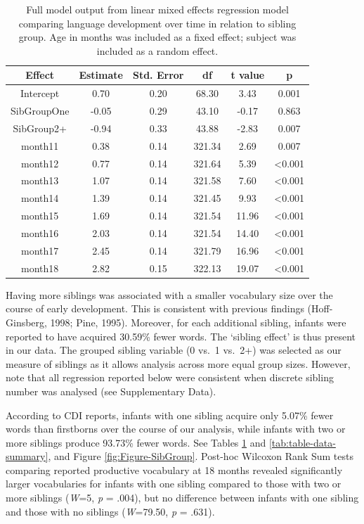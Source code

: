 \documentclass[
  man,floatsintext]{apa6}
\begin{document}
\begin{longtable}[t]{cccccc}
\caption{\label{tab:table-sibgroup-model-summary}Full model output from linear mixed effects regression model comparing language development over time in relation to sibling group. Age in months was included as a fixed effect; subject was included as a random effect.}\\
\toprule
Effect & Estimate & Std. Error & df & t value & p\\
\midrule
Intercept & 0.70 & 0.20 & 68.30 & 3.43 & 0.001\\
SibGroupOne & -0.05 & 0.29 & 43.10 & -0.17 & 0.863\\
SibGroup2+ & -0.94 & 0.33 & 43.88 & -2.83 & 0.007\\
month11 & 0.38 & 0.14 & 321.34 & 2.69 & 0.007\\
month12 & 0.77 & 0.14 & 321.64 & 5.39 & <0.001\\
\addlinespace
month13 & 1.07 & 0.14 & 321.58 & 7.60 & <0.001\\
month14 & 1.39 & 0.14 & 321.45 & 9.93 & <0.001\\
month15 & 1.69 & 0.14 & 321.54 & 11.96 & <0.001\\
month16 & 2.03 & 0.14 & 321.54 & 14.40 & <0.001\\
month17 & 2.45 & 0.14 & 321.79 & 16.96 & <0.001\\
\addlinespace
month18 & 2.82 & 0.15 & 322.13 & 19.07 & <0.001\\
\bottomrule
\end{longtable}

Having more siblings was associated with a smaller vocabulary size over the course of early development. This is consistent with previous findings (Hoff-Ginsberg, 1998; Pine, 1995). Moreover, for each additional sibling, infants were reported to have acquired 30.59\% fewer words. The `sibling effect' is thus present in our data. The grouped sibling variable (0 vs.~1 vs.~2+) was selected as our measure of siblings as it allows analysis across more equal group sizes. However, note that all regression reported below were consistent when discrete sibling number was analysed (see Supplementary Data).

According to CDI reports, infants with one sibling acquire only 5.07\% fewer words than firstborns over the course of our analysis, while infants with two or more siblings produce 93.73\% fewer words. See Tables \ref{tab:table-sibgroup-model-summary} and \ref{tab:table-data-summary}, and Figure \ref{fig:Figure-SibGroup}. Post-hoc Wilcoxon Rank Sum tests comparing reported productive vocabulary at 18 months revealed significantly larger vocabularies for infants with one sibling compared to those with two or more siblings (\emph{W}=5, \emph{p} = .004), but no difference between infants with one sibling and those with no siblings (\emph{W}=79.50, \emph{p} = .631).
\end{document}
